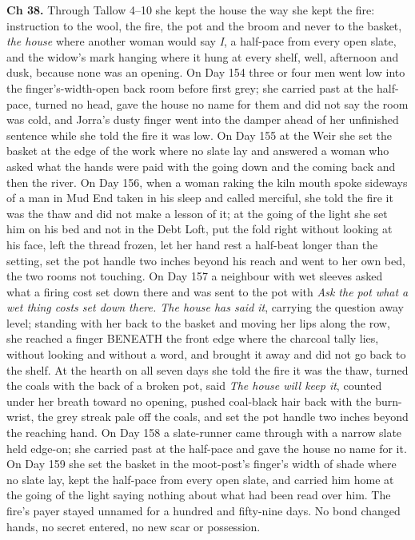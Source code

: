 \documentclass{design/chronicle}
\begin{document}
{\textbf{Ch 38.} Through Tallow 4–10 she kept the house the way she kept the fire: instruction to the wool, the fire, the pot and the broom and never to the basket, \emph{the house} where another woman would say \emph{I}, a half-pace from every open slate, and the widow’s mark hanging where it hung at every shelf, well, afternoon and dusk, because none was an opening. On Day 154 three or four men went low into the finger’s-width-open back room before first grey; she carried past at the half-pace, turned no head, gave the house no name for them and did not say the room was cold, and Jorra’s dusty finger went into the damper ahead of her unfinished sentence while she told the fire it was low. On Day 155 at the Weir she set the basket at the edge of the work where no slate lay and answered a woman who asked what the hands were paid with the going down and the coming back and then the river. On Day 156, when a woman raking the kiln mouth spoke sideways of a man in Mud End taken in his sleep and called merciful, she told the fire it was the thaw and did not make a lesson of it; at the going of the light she set him on his bed and not in the Debt Loft, put the fold right without looking at his face, left the thread frozen, let her hand rest a half-beat longer than the setting, set the pot handle two inches beyond his reach and went to her own bed, the two rooms not touching. On Day 157 a neighbour with wet sleeves asked what a firing cost set down there and was sent to the pot with \emph{Ask the pot what a wet thing costs set down there. The house has said it}, carrying the question away level; standing with her back to the basket and moving her lips along the row, she reached a finger BENEATH the front edge where the charcoal tally lies, without looking and without a word, and brought it away and did not go back to the shelf. At the hearth on all seven days she told the fire it was the thaw, turned the coals with the back of a broken pot, said \emph{The house will keep it}, counted under her breath toward no opening, pushed coal-black hair back with the burn-wrist, the grey streak pale off the coals, and set the pot handle two inches beyond the reaching hand. On Day 158 a slate-runner came through with a narrow slate held edge-on; she carried past at the half-pace and gave the house no name for it. On Day 159 she set the basket in the moot-post’s finger’s width of shade where no slate lay, kept the half-pace from every open slate, and carried him home at the going of the light saying nothing about what had been read over him. The fire’s payer stayed unnamed for a hundred and fifty-nine days. No bond changed hands, no secret entered, no new scar or possession.

}
\end{document}
